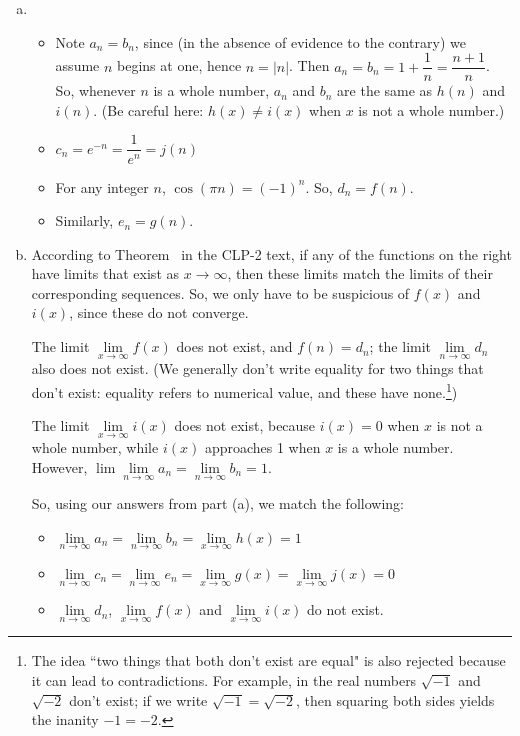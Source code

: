 \begin{solution}
\begin{enumerate}[(a)]
\item
\begin{itemize}
\item Note $a_n=b_n$, since (in the absence of evidence to the contrary) we assume $n$ begins at one, hence $n=|n|$. Then $a_n=b_n=1+\dfrac{1}{n}=\dfrac{n+1}{n}$. So, whenever $n$ is a whole number, $a_n$ and $b_n$ are the same as $h(n)$ and $i(n)$. (Be careful here: $h(x) \neq i(x)$ when $x$ is not a whole number.)
\item $c_n=e^{-n}=\dfrac{1}{e^n}=j(n)$
\item For any integer $n$, $\cos(\pi n) = (-1)^n$. So, $d_n = f(n)$.
\item Similarly, $e_n=g(n)$.
\end{itemize}
\item
According to Theorem~ in the CLP-2 text, if any of the functions on the right have limits that exist as $x \to \infty$, then these limits match the limits of their corresponding sequences. So, we only have to be suspicious of $f(x)$ and $i(x)$, since these do not converge.

The limit $\lim\limits_{x \to \infty}f(x)$ does not exist, and $f(n)=d_n$; the limit $\lim\limits_{n \to \infty}d_n$ also does not exist. (We generally don't write equality for two things that don't exist: equality refers to numerical value, and these have none.\footnote{The idea  ``two things that both don't exist are equal" is also rejected because it can lead to contradictions. For example, in the real numbers $\sqrt{-1}$ and $\sqrt{-2}$ don't exist; if we write $\sqrt{-1}=\sqrt{-2}$, then squaring both sides yields the inanity $-1=-2$.})

The limit $\lim\limits_{x \to \infty}i(x)$ does not exist, because $i(x)=0$ when $x$ is not a whole number, while $i(x)$ approaches 1 when $x$ is a whole number. However, $\lim\lim\limits_{n \to \infty}a_n=\lim\limits_{n \to \infty}b_n=1$.

So, using our answers from part (a), we match the following:
\begin{itemize}
\item $\lim\limits_{n \to \infty}a_n=\lim\limits_{n \to \infty}b_n=\lim\limits_{x \to \infty}h(x)=1$
\item $\lim\limits_{n \to \infty}c_n=\lim\limits_{n \to \infty}e_n=\lim\limits_{x \to \infty}g(x)=\lim\limits_{x \to \infty}j(x)=0$
\item $\lim\limits_{n \to \infty} d_n$,  $\lim\limits_{x\rightarrow\infty} f(x)$  and $\lim\limits_{x\rightarrow\infty} i(x)$ do not exist.
\end{itemize}
\end{enumerate}
\end{solution}

